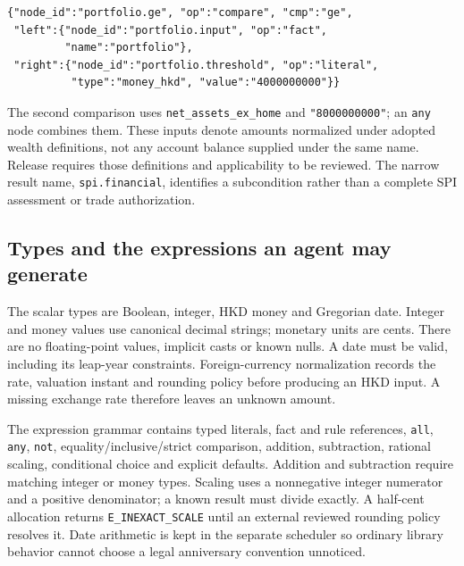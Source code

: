 \begin{minipage}{\textwidth}
\begin{lstlisting}[caption={The portfolio comparison in the supplied JSON bundle. Amounts are HK cents.}]
{"node_id":"portfolio.ge", "op":"compare", "cmp":"ge",
 "left":{"node_id":"portfolio.input", "op":"fact",
         "name":"portfolio"},
 "right":{"node_id":"portfolio.threshold", "op":"literal",
          "type":"money_hkd", "value":"4000000000"}}
\end{lstlisting}
\end{minipage}

The second comparison uses \texttt{net\_assets\_ex\_home} and
\texttt{"8000000000"}; an \texttt{any} node combines them. These inputs denote
amounts normalized under adopted wealth definitions, not any account balance
supplied under the same name. Release requires those definitions and applicability
to be reviewed. The narrow result name, \texttt{spi.financial}, identifies a
subcondition rather than a complete SPI assessment or trade authorization.

\subsection{Types and the expressions an agent may generate}
\label{merge:P-03a-rule-contract:00}


The scalar types are Boolean, integer, HKD money and Gregorian date. Integer
and money values use canonical decimal strings; monetary units are cents.
There are no floating-point values, implicit casts or known nulls. A date must
be valid, including its leap-year constraints. Foreign-currency normalization
records the rate, valuation instant and rounding policy before producing an HKD
input. A missing exchange rate therefore leaves an unknown amount.

The expression grammar contains typed literals, fact and rule references,
\texttt{all}, \texttt{any}, \texttt{not}, equality/inclusive/strict comparison,
addition, subtraction, rational scaling, conditional choice and explicit defaults.
Addition and subtraction require matching integer or money types. Scaling uses
a nonnegative integer numerator and a positive denominator; a known result must
divide exactly. A half-cent allocation returns \texttt{E\_INEXACT\_SCALE} until
an external reviewed rounding policy resolves it. Date arithmetic is kept in
the separate scheduler so ordinary library behavior cannot choose a legal
anniversary convention unnoticed.

